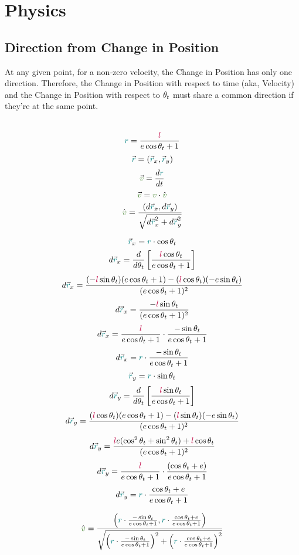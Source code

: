 

\chapter{Physics}
\section{Direction from Change in Position}
At any given point, for a non-zero velocity, the Change in Position has only one direction. Therefore, the Change in Position with respect to time (aka, Velocity) and the Change in Position with respect to $\true$ must share a common direction if they're at the same point.\\\\
\begin{minipage}{\textwidth}
\begin{multicols}{2}
\raggedcolumns
\noindent
$$\rad = \frac{\latus}{\textcolor{black}{e}\cos{\true} + 1}$$
$$\vec{\rad} = (\vec{\rad}_x, \vec{\rad}_y)$$
\columnbreak
$$\vec{\vel} = \frac{d\rad}{dt}$$
$$\vec{\vel}=\vel\cdot\hat{\vel}$$
$$\hat{\vel}=\frac{(d\vec{\rad}_x,d\vec{\rad}_y)}{\sqrt{d\vec{\rad}_x^2+d\vec{\rad}_y^2}}$$
\end{multicols}
\end{minipage}
\bigskip

\begin{minipage}{\textwidth}
\bigskip
\small
\begin{multicols}{2}
\raggedcolumns
\noindent
$$\vec{\rad}_x=\rad\cdot\cos{\true}$$
$$d\vec{\rad}_x=\frac{d}{d\true}\left[\frac{\latus\cos{\true}}{\e\cos{\true}+1}\right]$$
$$d\vec{\rad}_x=\frac{(-\latus\sin{\true})(\e\cos{\true}+1)-(\latus\cos{\true})(-\e\sin{\true})}{(\e\cos{\true}+1)^2}$$
$$d\vec{\rad}_x=\frac{-\latus\sin{\true}}{(\e\cos{\true}+1)^2}$$
$$d\vec{\rad}_x=\frac{\latus}{\e\cos{\true}+1}\cdot\frac{-\sin{\true}}{\e\cos{\true}+1}$$
$$d\vec{\rad}_x=\rad\cdot\frac{-\sin{\true}}{\e\cos{\true}+1}$$
\columnbreak
$$\vec{\rad}_y=\rad\cdot\sin{\true}$$
$$d\vec{\rad}_y=\frac{d}{d\true}\left[\frac{\latus\sin{\true}}{\e\cos{\true}+1}\right]$$
$$d\vec{\rad}_y=\frac{(\latus\cos{\true})(\e\cos{\true}+1)-(\latus\sin{\true})(-\e\sin{\true})}{(\e\cos{\true}+1)^2}$$
$$d\vec{\rad}_y=\frac{\latus\e(\cos^2{\true}+\sin^2{\true})+\latus\cos{\true}} {(\e\cos{\true}+1)^2}$$
$$d\vec{\rad}_y=\frac{\latus}{\e\cos{\true}+1}\cdot\frac{(\cos{\true} + \e)} {\e\cos{\true}+1}$$
$$d\vec{\rad}_y=\rad\cdot\frac{\cos{\true}+\e} {\e\cos{\true}+1}$$
\columnbreak
\end{multicols}
\end{minipage}
\newpage
\small
$$\hat{\vel}=\frac{\left(\rad\cdot\frac{-\sin{\true}}{\e\cos{\true}+1},\rad\cdot\frac{\cos{\true}+\e} {\e\cos{\true}+1}\right)}{\sqrt{\left(\rad\cdot\frac{-\sin{\true}}{\e\cos{\true}+1}\right)^2+\left(\rad\cdot\frac{\cos{\true}+\e} {\e\cos{\true}+1}\right)^2}}$$


